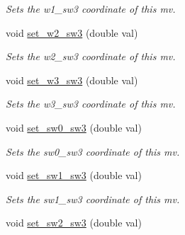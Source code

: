\begin{DoxyCompactItemize}
\begin{DoxyCompactList}\small\item\em Sets the w1\-\_\-sw3 coordinate of this mv. \end{DoxyCompactList}\item 
\hypertarget{classe3ga_1_1mv_a9f5882470ef38d7e8dc5843969dfd57c}{void \hyperlink{classe3ga_1_1mv_a9f5882470ef38d7e8dc5843969dfd57c}{set\-\_\-w2\-\_\-sw3} (double val)}\label{classe3ga_1_1mv_a9f5882470ef38d7e8dc5843969dfd57c}

\begin{DoxyCompactList}\small\item\em Sets the w2\-\_\-sw3 coordinate of this mv. \end{DoxyCompactList}\item 
\hypertarget{classe3ga_1_1mv_af7d7ac4757b27397d0e845a02a7f01ea}{void \hyperlink{classe3ga_1_1mv_af7d7ac4757b27397d0e845a02a7f01ea}{set\-\_\-w3\-\_\-sw3} (double val)}\label{classe3ga_1_1mv_af7d7ac4757b27397d0e845a02a7f01ea}

\begin{DoxyCompactList}\small\item\em Sets the w3\-\_\-sw3 coordinate of this mv. \end{DoxyCompactList}\item 
\hypertarget{classe3ga_1_1mv_ad8c05a6428f9ef7ed1a3f4b6337a3626}{void \hyperlink{classe3ga_1_1mv_ad8c05a6428f9ef7ed1a3f4b6337a3626}{set\-\_\-sw0\-\_\-sw3} (double val)}\label{classe3ga_1_1mv_ad8c05a6428f9ef7ed1a3f4b6337a3626}

\begin{DoxyCompactList}\small\item\em Sets the sw0\-\_\-sw3 coordinate of this mv. \end{DoxyCompactList}\item 
\hypertarget{classe3ga_1_1mv_a598a3596c14c1649e4c248a8de74cc8e}{void \hyperlink{classe3ga_1_1mv_a598a3596c14c1649e4c248a8de74cc8e}{set\-\_\-sw1\-\_\-sw3} (double val)}\label{classe3ga_1_1mv_a598a3596c14c1649e4c248a8de74cc8e}

\begin{DoxyCompactList}\small\item\em Sets the sw1\-\_\-sw3 coordinate of this mv. \end{DoxyCompactList}\item 
\hypertarget{classe3ga_1_1mv_ac1745f732189277feface233a9ef00cf}{void \hyperlink{classe3ga_1_1mv_ac1745f732189277feface233a9ef00cf}{set\-\_\-sw2\-\_\-sw3} (double val)}\label{classe3ga_1_1mv_ac1745f732189277feface233a9ef00cf}


\end{DoxyCompactItemize}
